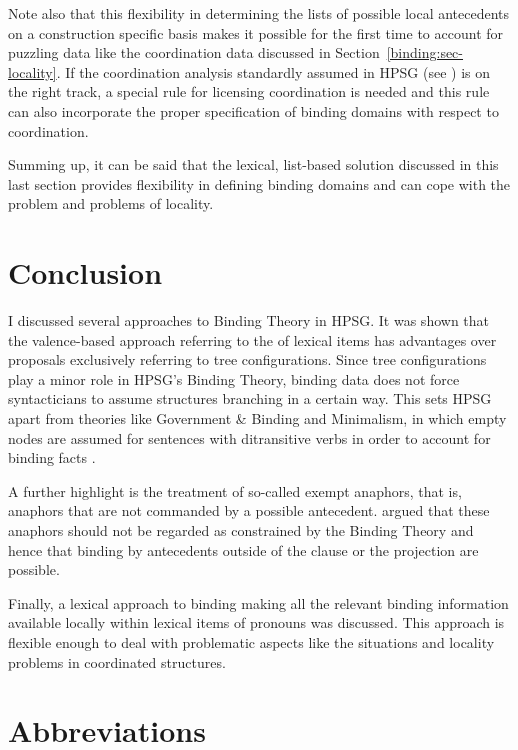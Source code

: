\documentclass[output=paper
 	        ,biblatex
                ,babelshorthands
                ,newtxmath
                ,draftmode
                ,colorlinks, citecolor=brown
]{langscibook}
\begin{document}
Note also that this flexibility in determining the lists of possible local antecedents on a
construction specific basis makes it possible for the first time to account for puzzling data like
the coordination data discussed in Section~\ref{binding:sec-locality}. If the coordination analysis
standardly assumed in HPSG (see ) is on the right track, a special
rule for licensing coordination is needed and this rule can also incorporate the proper
specification of binding domains with respect to coordination.


Summing up, it can be said that the lexical, list-based solution discussed in this last section
provides flexibility in defining binding domains and can cope with the \iwithini problem and
problems of locality. 


\section{Conclusion}

I discussed several approaches to Binding Theory in HPSG. It was shown that the
valence-based approach referring to the \argstl of lexical items has advantages over proposals
exclusively referring to tree configurations. Since tree configurations play a minor role in HPSG's
Binding Theory, binding data does not force syntacticians to assume structures branching in a
certain way. This sets HPSG apart from theories like Government \& Binding and Minimalism, in which
empty nodes are assumed for sentences with ditransitive verbs in order to account for binding facts
\crossrefchapterp[\pageref{minimalism:page-binding-branching-start}--\pageref{minimalism:page-binding-branching-end}]{minimalism}. 

A further highlight is the treatment of so-called exempt anaphors, that is, anaphors that are not
commanded by a possible antecedent. \citet{PS92a}
argued that these anaphors should not be regarded
as constrained by the Binding Theory and hence that binding by antecedents outside of the clause or
the projection are possible.

Finally, a lexical approach to binding making all the relevant binding information
available locally within lexical items of pronouns was discussed. This approach is flexible enough to deal with
problematic aspects like the \iwithini situations and locality problems in coordinated structures.

\section*{Abbreviations}
\end{document}
